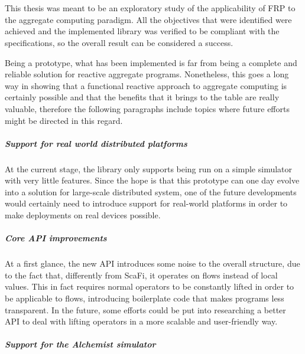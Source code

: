 \chapter{\conclusionsname}
\label{chap:conclusions}

This thesis was meant to be an exploratory study of the applicability of FRP to the aggregate computing paradigm.
%
All the objectives that were identified were achieved and the implemented library was verified to be compliant with the specifications, so the overall result can be considered a success.

Being a prototype, what has been implemented is far from being a complete and reliable solution for reactive aggregate programs.
%
Nonetheless, this goes a long way in showing that a functional reactive approach to aggregate computing is certainly possible and that the benefits that it brings to the table are really valuable, therefore the following paragraphs include topics where future efforts might be directed in this regard.

\paragraph{Support for real world distributed platforms}

At the current stage, the library only supports being run on a simple simulator with very little features.
%
Since the hope is that this prototype can one day evolve into a solution for large-scale distributed system, one of the future developments would certainly need to introduce support for real-world platforms in order to make deployments on real devices possible.

\paragraph{Core API improvements}

At a first glance, the new API introduces some noise to the overall structure, due to the fact that, differently from ScaFi, it operates on flows instead of local values.
%
This in fact requires normal operators to be constantly lifted in order to be applicable to flows, introducing boilerplate code that makes programs less transparent.
%
In the future, some efforts could be put into researching a better API to deal with lifting operators in a more scalable and user-friendly way.

\paragraph{Support for the Alchemist simulator}

